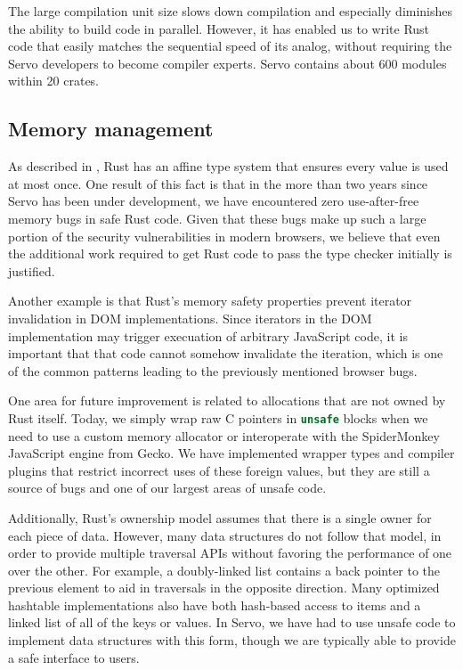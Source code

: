 The large compilation unit size slows down compilation and especially diminishes the ability to build code in parallel.
However, it has enabled us to write Rust code that easily matches the sequential speed of its \Cplusplus{} analog, without requiring the Servo developers to become compiler experts.
Servo contains about 600 modules within 20 crates.

\subsection{Memory management}
As described in , Rust has an affine type system that ensures every value is used at
most once.
One result of this fact is that in the more than two years since Servo has been under development, we have
encountered zero use-after-free memory bugs in safe Rust code.
Given that these bugs make up such a large portion of the security vulnerabilities in modern browsers,
we believe that even the additional work required to get Rust code to pass the type checker initially is
justified.

Another example is that Rust's memory safety properties prevent iterator
invalidation in DOM implementations. Since iterators in the DOM implementation
may trigger execuation of arbitrary JavaScript code, it is important that that
code cannot somehow invalidate the iteration, which is one of the common
patterns leading to the previously mentioned browser bugs.

One area for future improvement is related to allocations that are not owned by Rust itself.
Today, we simply wrap raw C pointers in \lstinline[language=Rust]{unsafe} blocks when we need to use a
custom memory allocator or interoperate with the SpiderMonkey JavaScript engine from Gecko.
We have implemented wrapper types and compiler plugins that restrict incorrect uses of these foreign values,
but they are still a source of bugs and one of our largest areas of unsafe code.

Additionally, Rust's ownership model assumes that there is a single owner for each piece of data.
However, many data structures do not follow that model, in order to provide multiple traversal
APIs without favoring the performance of one over the other.
For example, a doubly-linked list contains a back pointer to the previous element to aid
in traversals in the opposite direction.
Many optimized hashtable implementations also have both hash-based access to items
and a linked list of all of the keys or values.
In Servo, we have had to use unsafe code to implement data structures with this form,
though we are typically able to provide a safe interface to users.

